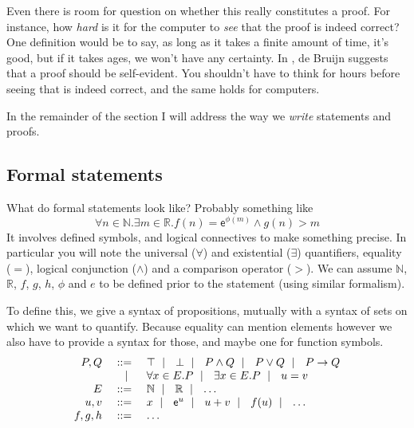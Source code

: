Even there is room for question on whether this really constitutes a proof.
For instance, how \emph{hard} is it for the computer to \emph{see} that the
proof is indeed correct? One definition would be to say, as long as it takes
a finite amount of time, it's good, but if it takes ages, we won't have any
certainty. In , de Bruijn suggests that a proof should be
self-evident. You shouldn't have to think for hours before seeing that is indeed
correct, and the same holds for computers.

In the remainder of the section I will address the way we \emph{write}
statements and proofs.

\subsection{Formal statements}

What do formal statements look like? Probably something like
\[
  \forall n \in \mathbb{N}. \exists m \in \mathbb{R}.
  f(n) = \mathsf{e}^{\phi(m)} \wedge g(n) > m
\]
It involves defined symbols, and logical connectives to make something precise.
In particular you will note the universal (\(\forall\)) and existential
(\(\exists\)) quantifiers, equality (\(=\)), logical conjunction (\(\wedge\))
and a comparison operator (\(>\)).
We can assume \(\mathbb{N}\), \(\mathbb{R}\), \(f\), \(g\), \(h\), \(\phi\) and
\(e\) to be defined prior to the statement (using similar formalism).

To define this, we give a syntax of propositions, mutually with a syntax of
sets on which we want to quantify. Because equality can mention elements however
we also have to provide a syntax for those, and maybe one for function symbols.
\[
  \begin{array}{rrl}
    P, Q &\ \mathrel{{:}{:}{=}}\ & \top \ \mid\ \  \bot \ \mid\ \  P \wedge Q \ \mid\ \  P \vee Q
    \ \mid\ \  P \to Q \\
    &\ \mid\ \ & \forall x \in E. P \ \mid\ \  \exists x \in E. P \ \mid\ \  u = v \\
    E &\ \mathrel{{:}{:}{=}}\ & \mathbb{N} \ \mid\ \  \mathbb{R} \ \mid\ \  \dots \\
    u, v &\ \mathrel{{:}{:}{=}}\ & x \ \mid\ \  \mathsf{e}^u \ \mid\ \  u + v \ \mid\ \  f(u) \ \mid\ \  \dots \\
    f, g, h &\ \mathrel{{:}{:}{=}}\ & \dots
  \end{array}
\]

